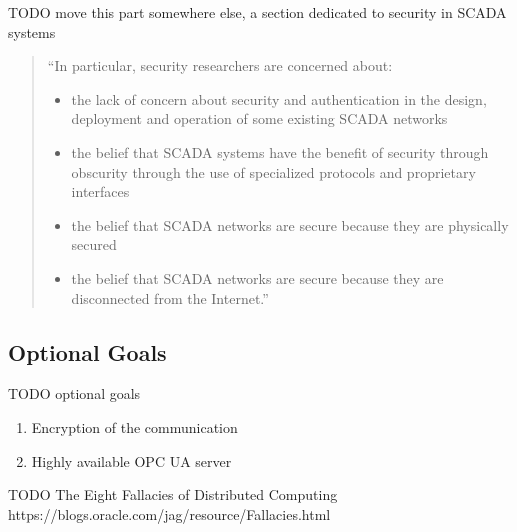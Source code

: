 TODO move this part somewhere else, a section dedicated to security in SCADA systems
\begin{quote}

``In particular, security researchers are concerned about:
	\begin{itemize}
		\item the lack of concern about security and authentication in the design, deployment and operation of some existing SCADA networks
		\item the belief that SCADA systems have the benefit of security through obscurity through the use of specialized protocols and proprietary interfaces
		\item the belief that SCADA networks are secure because they are physically secured
		\item the belief that SCADA networks are secure because they are disconnected from the Internet.''
	\end{itemize}
\end{quote}

\subsection*{Optional Goals}
TODO optional goals

\begin{enumerate}
	\item Encryption of the communication
	\item Highly available OPC UA server
\end{enumerate}


TODO The Eight Fallacies of Distributed Computing
https://blogs.oracle.com/jag/resource/Fallacies.html
